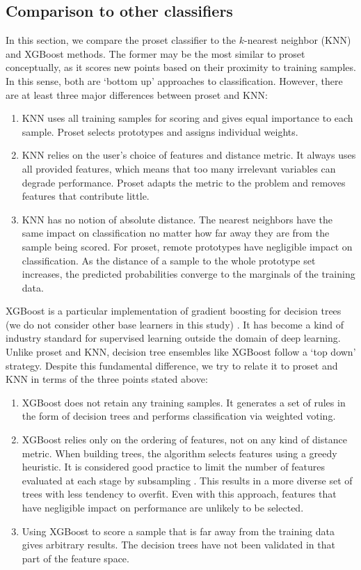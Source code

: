 \subsection{Comparison to other classifiers}
\label{sec_comparison_classifier}
%
In this section, we compare the proset classifier to the $k$-nearest neighbor (KNN) and XGBoost methods.
The former may be the most similar to proset conceptually, as it scores new points based on their proximity to training samples.
In this sense, both are `bottom up' approaches to classification.
However, there are at least three major differences between proset and KNN:
%
\begin{enumerate}
\item KNN uses all training samples for scoring and gives equal importance to each sample.
Proset selects prototypes and assigns individual weights.
%
\item KNN relies on the user's choice of features and distance metric.
It always uses all provided features, which means that too many irrelevant variables can degrade performance.
Proset adapts the metric to the problem and removes features that contribute little.
%
\item KNN has no notion of absolute distance.
The nearest neighbors have the same impact on classification no matter how far away they are from the sample being scored.
For proset, remote prototypes have negligible impact on classification.
As the distance of a sample to the whole prototype set increases, the predicted probabilities converge to the marginals of the training data.
\end{enumerate}
%
XGBoost is a particular implementation of gradient boosting for decision trees (we do not consider other base learners in this study) \cite{Chen_16}.
It has become a kind of industry standard for supervised learning outside the domain of deep learning.
Unlike proset and KNN, decision tree ensembles like XGBoost follow a `top down' strategy.
Despite this fundamental difference, we try to relate it to proset and KNN in terms of the three points stated above:
%
\begin{enumerate}
\item XGBoost does not retain any training samples.
It generates a set of rules in the form of decision trees and performs classification via weighted voting.
%
\item XGBoost relies only on the ordering of features, not on any kind of distance metric.
When building trees, the algorithm selects features using a greedy heuristic.
It is considered good practice to limit the number of features evaluated at each stage by subsampling \cite{Chen_16}.
This results in a more diverse set of trees with less tendency to overfit.
Even with this approach, features that have negligible impact on performance are unlikely to be selected.
%
\item Using XGBoost to score a sample that is far away from the training data gives arbitrary results.
The decision trees have not been validated in that part of the feature space.
\end{enumerate}
